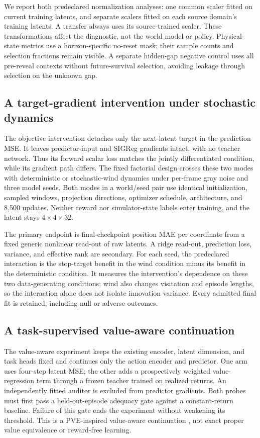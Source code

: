 We report both predeclared normalization analyses: one common scaler fitted on current training
latents, and separate scalers fitted on each source domain's training latents. A transfer always
uses its source-trained scaler. These transformations affect the diagnostic, not the world model
or policy. Physical-state metrics use a horizon-specific no-reset mask; their sample counts and
selection fractions remain visible. A separate hidden-gap negative control uses all pre-reveal
contexts without future-survival selection, avoiding leakage through selection on the unknown gap.

\subsection{A target-gradient intervention under stochastic dynamics}
\label{sec:target-method}
The objective intervention detaches only the next-latent target in the prediction MSE. It leaves
predictor-input and SIGReg gradients intact, with no teacher network. Thus its forward scalar loss
matches the jointly differentiated condition, while its gradient path differs. The fixed factorial
design crosses these two modes with deterministic or stochastic-wind dynamics under per-frame gray
noise and three model seeds. Both modes in a world/seed pair use identical initialization, sampled
windows, projection directions, optimizer schedule, architecture, and 8,500 updates. Neither reward
nor simulator-state labels enter training, and the latent stays $4\times4\times32$.

The primary endpoint is final-checkpoint position MAE per coordinate from a fixed generic nonlinear
read-out of raw latents. A ridge read-out, prediction loss, variance, and effective rank are secondary.
For each seed, the predeclared interaction is the stop-target benefit in the wind condition minus
its benefit in the deterministic condition. It measures the intervention's dependence on these two
data-generating conditions; wind also changes visitation and episode lengths, so the interaction
alone does not isolate innovation variance. Every admitted final fit is retained, including null
or adverse outcomes.

\subsection{A task-supervised value-aware continuation}
\label{sec:pve-method}
The value-aware experiment keeps the existing encoder, latent dimension, and task heads fixed and
continues only the action encoder and predictor. One arm uses four-step latent MSE; the other adds
a prospectively weighted value-regression term through a frozen teacher trained on realized returns.
An independently fitted auditor is excluded from predictor gradients. Both probes must first pass
a held-out-episode adequacy gate against a constant-return baseline. Failure of this gate ends the
experiment without weakening its threshold. This is a PVE-inspired value-aware continuation
\citep{grimm2021proper}, not exact proper value equivalence or reward-free learning.
